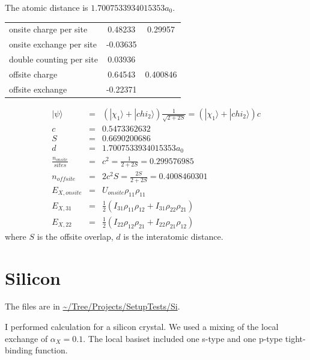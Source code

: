 \documentclass[11pt,a4paper]{report}
\begin{document}
\begin{enumerate}
The atomic distance is $1.7007533934015353 a_0$.
\begin{center}
\begin{tabular}{lcc}
onsite charge per site   &  0.48233 & 0.29957\\
onsite exchange per site & -0.03635 & \\
double counting per site &  0.03936 & \\
offsite charge           &  0.64543 & 0.400846\\
offsite exchange         & -0.22371 & \\
\hline
\end{tabular}
\end{center}

\begin{eqnarray}
|\psi\rangle
&=&\left(|\chi_1\rangle+|chi_2\rangle\right)\frac{1}{\sqrt{2+2S}}
=\left(|\chi_1\rangle+|chi_2\rangle\right) c
\nonumber\\
c&=&0.5473362632
\nonumber\\
S&=& 0.6690200686
\nonumber\\
d&=&1.7007533934015353 a_0
\nonumber\\
\frac{n_{onsite}}{sites}&=&c^2=\frac{1}{2+2S}=0.299576985
\nonumber\\
n_{offsite}&=&2c^2S=\frac{2S}{2+2S}=0.4008460301
\nonumber\\
E_{X,onsite}&=&U_{onsite}\rho_{11}\rho_{11}
\nonumber\\
E_{X,31}&=&\frac{1}{2}
\left(I_{31}\rho_{11}\rho_{12}+I_{31}\rho_{22}\rho_{21}\right)
\nonumber\\
E_{X,22}&=&\frac{1}{2}
\left(I_{22}\rho_{12}\rho_{21}+I_{22}\rho_{21}\rho_{12}\right)
\end{eqnarray}
where $S$ is the offsite overlap, $d$ is the interatomic distance.
\end{enumerate}

\section{Silicon}
The files are in \url{~/Tree/Projects/SetupTests/Si}.

I performed calculation for a silicon crystal. We used a mixing of the
local exchange of $\alpha_X=0.1$. The local basiset included one
s-type and one p-type tight-binding function.
\end{document}
